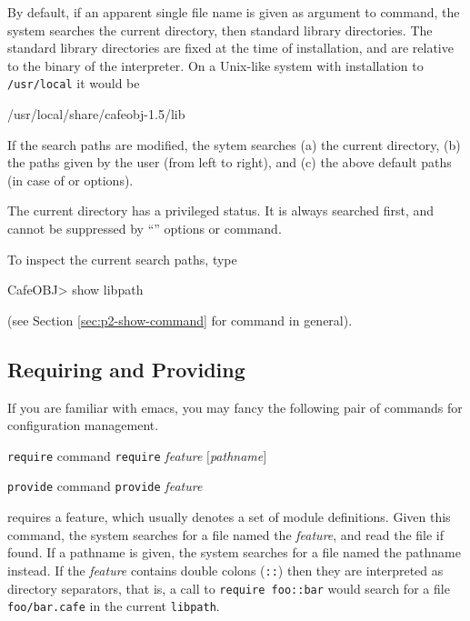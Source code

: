 \documentclass[a4paper]{memoir}
\begin{document}
By default, if an apparent single file name is given as argument to
 command, the system searches the current directory,
then standard library directories. The standard library directories
are fixed at the time of installation, and are relative to the binary
of the interpreter. On a Unix-like system with installation to
\verb|/usr/local| it would be
\begin{vvtm}
\begin{ccode}
  /usr/local/share/cafeobj-1.5/lib
\end{ccode}
\end{vvtm}
If the search paths are modified, the sytem searches (a) the current
directory, (b) the paths given by the user (from left to right), and
(c) the above default paths (in case of \kbd{+} or  options).

\begin{warning}
  The current directory has a privileged status. It is always searched
  first, and cannot be suppressed by ``'' options or 
  command.
\end{warning}

To inspect the current search paths, type
\begin{vvtm}
\begin{ccode}
  CafeOBJ> show libpath
\end{ccode}
\end{vvtm}
(see Section \ref{sec:p2-show-command} for  command in general).

\subsection{Requiring and Providing}

If you are familiar with emacs, you may fancy the
following pair of commands for configuration management.

\begin{bsyntax} \texttt{require} command \Hline
\texttt{require} \textit{feature} $[$\textit{pathname}$]$
\end{bsyntax}

\begin{bsyntax} \texttt{provide} command \Hline
\texttt{provide} \textit{feature}
\end{bsyntax}

 requires a feature, which usually
denotes a set of module definitions. Given this command, the
system searches for a file named the \textit{feature}, and read the file
if found. If a pathname is given, the system searches for a file
named the pathname instead. If the \textit{feature} contains double colons
(\verb|::|) then they are interpreted as directory separators, that
is, a call to \verb|require foo::bar| would search for a file
\verb|foo/bar.cafe| in the current \verb|libpath|.
\end{document}

